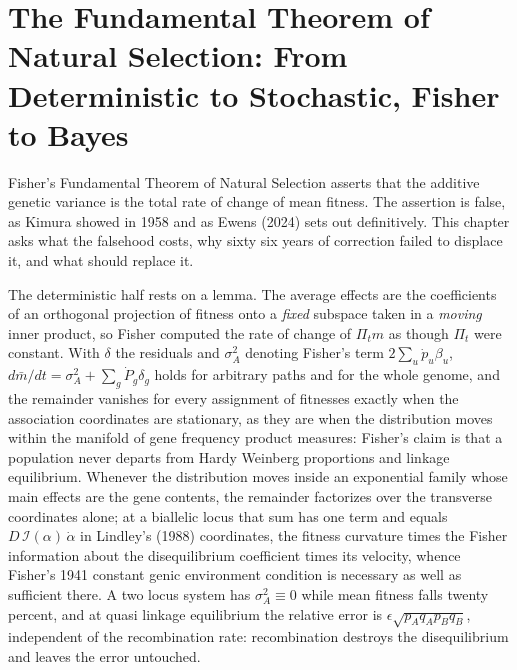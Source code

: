 \DeclareRobustCommand{\wbar}{\bar{w}}
\DeclareRobustCommand{\mbar}{\bar{m}}
\DeclareRobustCommand{\E}{\mathbb{E}}
\DeclareRobustCommand{\Var}{\operatorname{Var}}
\DeclareRobustCommand{\Cov}{\operatorname{Cov}}
\DeclareRobustCommand{\sA}{\sigma^{2}_{A}}
\DeclareRobustCommand{\Prob}{\mathbb{P}}
\DeclareRobustCommand{\HW}{\mathcal{M}}
\DeclareRobustCommand{\R}{\mathcal{R}}
\chapter{The Fundamental Theorem of Natural Selection: From Deterministic to Stochastic, Fisher to Bayes}\label{ch:ftns}
\begin{chaptersummary}
Fisher's Fundamental Theorem of Natural Selection asserts that the additive genetic variance is
the total rate of change of mean fitness. The assertion is false, as Kimura showed in 1958 and as
Ewens (2024) sets out definitively. This chapter asks what the falsehood costs, why sixty six years
of correction failed to displace it, and what should replace it.

The deterministic half rests on a lemma. The average effects are the coefficients of an orthogonal
projection of fitness onto a \emph{fixed} subspace taken in a \emph{moving} inner product, so
Fisher computed the rate of change of $\Pi_tm$ as though $\Pi_t$ were constant. With $\delta$ the
residuals and $\sA$ denoting Fisher's term $2\sum_u\dot p_u\beta_u$, $d\mbar/dt=\sA+\sum_g\dot P_g\delta_g$ holds for arbitrary paths and for the whole
genome, and the remainder vanishes for every assignment of fitnesses exactly when the association coordinates are stationary, as they are when the distribution moves within the manifold of
gene frequency product measures: Fisher's claim is that a population never departs from
Hardy Weinberg proportions and linkage equilibrium. Whenever the distribution moves inside an exponential family whose main
effects are the gene contents, the remainder factorizes over the transverse coordinates alone; at a
biallelic locus that sum has one term and equals $D\,\mathcal{I}(\alpha)\,\dot\alpha$ in Lindley's
(1988) coordinates, the fitness curvature times the Fisher information about the disequilibrium
coefficient times its velocity, whence Fisher's 1941 constant genic environment
condition is necessary as well as sufficient there. A two locus system has $\sA\equiv0$ while mean fitness falls twenty percent, and at
quasi linkage equilibrium the relative error is $\epsilon\sqrt{p_Aq_Ap_Bq_B}$, independent of the
recombination rate: recombination destroys the disequilibrium and leaves the error untouched.


\end{chaptersummary}

